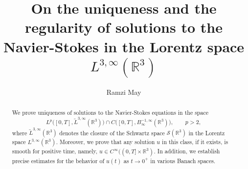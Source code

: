 \documentclass[11pt]{amsart}%
\theoremstyle{plain}
\numberwithin{equation}{section}
\begin{document}
\title[Navier-Stokes equations in $L^{3,\infty}(\mathbb{R}^3)$]
{On the uniqueness and the regularity of solutions to the Navier-Stokes in the Lorentz space $L^{3,\infty}(\mathbb{R}^3)$}%
\author{Ramzi May}%
\address{Department of Mathematics and Statistics, College of Science, King Faisal University, Al-Ahsa, Kingdom of Saudi Arabia}

\begin{abstract}
We prove uniqueness of solutions to the Navier-Stokes equations in the space
\[
L^p\bigl([0,T],\widetilde{L}^{3,\infty}(\mathbb{R}^3)\bigr)
\cap
C\bigl([0,T],B^{-1,\infty}_{\infty}(\mathbb{R}^3)\bigr),
\qquad p>2,
\]
where $\widetilde{L}^{3,\infty}(\mathbb{R}^3)$ denotes the closure of the Schwartz space $\mathcal{S}(\mathbb{R}^3)$ in the Lorentz space $L^{3,\infty}(\mathbb{R}^3)$. Moreover, we prove that any solution $u$ in this class, if it exists, is smooth for positive time, namely,  $u\in C^\infty((0,T]\times \mathbb{R}^3)$. In addition, we establish precise estimates for the behavior of $u(t)$ as $t\to0^+ $  in various Banach spaces.
\end{abstract}
\maketitle
\end{document}
